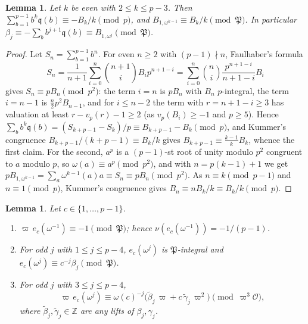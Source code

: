 \documentclass[11pt]{amsart}
\newtheorem{lemma}[theorem]{Lemma}
\theoremstyle{definition}
\theoremstyle{remark}
\providecommand{\Z}{\mathbb Z}
\newcommand{\fq}{\mathfrak q}
\newcommand{\fP}{\mathfrak P}
\newcommand{\Ok}{\mathcal O}
\numberwithin{equation}{section}
\begin{document}
\begin{lemma}\label{lem:sums}
Let $k$ be even with $2\le k\le p-3$.
Then $\sum_{b=1}^{p-1}b^k\fq(b)\equiv-B_k/k\pmod p$, and $B_{1,\omega^{k-1}}\equiv B_k/k\pmod\fP$.
In particular $\beta_j\equiv-\sum_bb^{j+1}\fq(b)\equiv B_{1,\omega^j}\pmod\fP$.
\end{lemma}

\begin{proof}
Let $S_n=\sum_{b=1}^{p-1}b^n$.
For even $n\ge2$ with $(p-1)\nmid n$, Faulhaber's formula
\[
S_n=\frac1{n+1}\sum_{i=0}^{n}\binom{n+1}{i}B_ip^{n+1-i}=\sum_{i=0}^{n}\binom ni\frac{p^{n+1-i}}{n+1-i}B_i
\]
gives $S_n\equiv pB_n\pmod{p^2}$: the term $i=n$ is $pB_n$ with $B_n$ $p$-integral, the term $i=n-1$ is $\frac n2p^2B_{n-1}$, and for $i\le n-2$ the term with $r=n+1-i\ge3$ has valuation at least $r-v_p(r)-1\ge2$ (as $v_p(B_i)\ge-1$ and $p\ge5$).
Hence $\sum_bb^k\fq(b)=(S_{k+p-1}-S_k)/p\equiv B_{k+p-1}-B_k\pmod p$, and Kummer's congruence $B_{k+p-1}/(k+p-1)\equiv B_k/k$ gives $B_{k+p-1}\equiv\frac{k-1}{k}B_k$, whence the first claim.
For the second, $a^p$ is a $(p-1)$-st root of unity modulo $p^2$ congruent to $a$ modulo $p$, so $\omega(a)\equiv a^p\pmod{p^2}$, and with $n=p(k-1)+1$ we get $pB_{1,\omega^{k-1}}=\sum_a\omega^{k-1}(a)a\equiv S_n\equiv pB_n\pmod{p^2}$.
As $n\equiv k\pmod{p-1}$ and $n\equiv1\pmod p$, Kummer's congruence gives $B_n\equiv nB_k/k\equiv B_k/k\pmod p$.
\end{proof}

\begin{lemma}\label{lem:expansion}
Let $c\in\{1,\dots,p-1\}$.
\begin{enumerate}
\item $\varpi\,e_c(\omega^{-1})\equiv-1\pmod\fP$; hence $\nu(e_c(\omega^{-1}))=-1/(p-1)$.
\item For odd $j$ with $1\le j\le p-4$, $e_c(\omega^j)$ is $\fP$-integral and $e_c(\omega^j)\equiv c^{-j}\beta_j\pmod\fP$.
\item For odd $j$ with $3\le j\le p-4$,
\[
\varpi\,e_c(\omega^j)\equiv\omega(c)^{-j}\bigl(\tilde\beta_j\,\varpi+c\,\tilde\gamma_j\,\varpi^2\bigr)\pmod{\varpi^3\Ok},
\]
where $\tilde\beta_j,\tilde\gamma_j\in\Z$ are any lifts of $\beta_j,\gamma_j$.
\end{enumerate}
\end{lemma}
\end{document}
